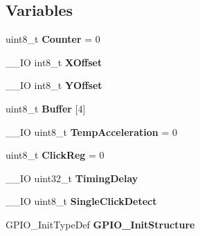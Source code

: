 \subsection*{Variables}
\begin{DoxyCompactItemize}
\item 
\hypertarget{group___sys_tick___example_ga023d9e3f823118cee07edc493b68e0d4}{uint8\-\_\-t {\bfseries Counter} = 0}\label{group___sys_tick___example_ga023d9e3f823118cee07edc493b68e0d4}

\item 
\hypertarget{group___sys_tick___example_ga65ae650a8f9852583e5115c6cef63564}{\-\_\-\-\_\-\-I\-O int8\-\_\-t {\bfseries X\-Offset}}\label{group___sys_tick___example_ga65ae650a8f9852583e5115c6cef63564}

\item 
\hypertarget{group___sys_tick___example_gaabec2e8b238c68bcf7a52f977a738f04}{\-\_\-\-\_\-\-I\-O int8\-\_\-t {\bfseries Y\-Offset}}\label{group___sys_tick___example_gaabec2e8b238c68bcf7a52f977a738f04}

\item 
\hypertarget{group___sys_tick___example_gabd80ff08dc4407c1408b05c9e8ad400c}{uint8\-\_\-t {\bfseries Buffer} \mbox{[}4\mbox{]}}\label{group___sys_tick___example_gabd80ff08dc4407c1408b05c9e8ad400c}

\item 
\hypertarget{group___sys_tick___example_ga6fa8375c8168ca9a7c94f1be2a04e3db}{\-\_\-\-\_\-\-I\-O uint8\-\_\-t {\bfseries Temp\-Acceleration} = 0}\label{group___sys_tick___example_ga6fa8375c8168ca9a7c94f1be2a04e3db}

\item 
\hypertarget{group___sys_tick___example_ga67299a22e2291ffc112aa828744f08ea}{uint8\-\_\-t {\bfseries Click\-Reg} = 0}\label{group___sys_tick___example_ga67299a22e2291ffc112aa828744f08ea}

\item 
\hypertarget{group___sys_tick___example_gaf484abe0ca156dc40cf0fb5e79d4d6db}{\-\_\-\-\_\-\-I\-O uint32\-\_\-t {\bfseries Timing\-Delay}}\label{group___sys_tick___example_gaf484abe0ca156dc40cf0fb5e79d4d6db}

\item 
\hypertarget{group___sys_tick___example_gadd1e9305c0bb616ee59a705531d11bee}{\-\_\-\-\_\-\-I\-O uint8\-\_\-t {\bfseries Single\-Click\-Detect}}\label{group___sys_tick___example_gadd1e9305c0bb616ee59a705531d11bee}

\item 
\hypertarget{group___sys_tick___example_ga58d8a7f3700f34e7226b33e61f5ed960}{G\-P\-I\-O\-\_\-\-Init\-Type\-Def {\bfseries G\-P\-I\-O\-\_\-\-Init\-Structure}}\label{group___sys_tick___example_ga58d8a7f3700f34e7226b33e61f5ed960}

\end{DoxyCompactItemize}


